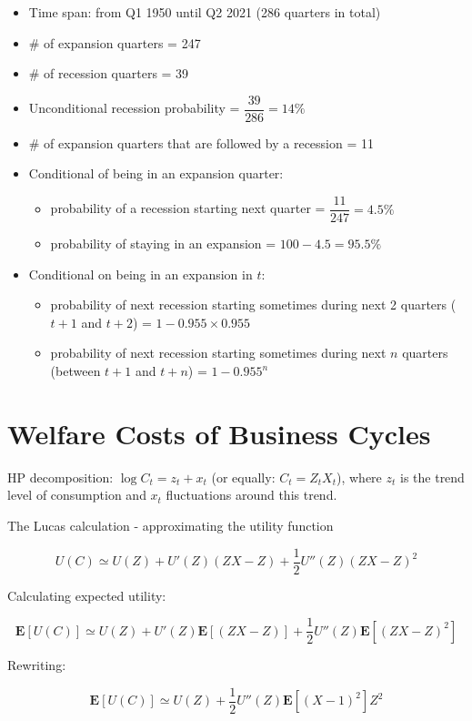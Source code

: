 \documentclass{article}
\begin{document}
\begin{itemize}
    \item Time span: from Q1 1950 until Q2 2021 (286 quarters in total)
    \item \# of expansion quarters = 247
    \item \# of recession quarters = 39
    \item Unconditional recession probability = $\dfrac{39}{286}=14\%$
    \item \# of expansion quarters that are followed by a recession = 11
    \item Conditional of being in an expansion quarter:
    \begin{itemize}
        \item probability of a recession starting next quarter = $\dfrac{11}{247}=4.5\%$
        \item probability of staying in an expansion = $100-4.5=95.5\%$
    \end{itemize}
    \item Conditional on being in an expansion in $t$:
    \begin{itemize}
        \item probability of next recession starting sometimes during next 2 quarters ($t+1$ and $t+2$) = $1-0.955\times0.955$
        \item probability of next recession starting sometimes during next $n$ quarters (between $t+1$ and $t+n$) = $1-0.955^n$
    \end{itemize}
\end{itemize}

\section{Welfare Costs of Business Cycles}


HP decomposition: $\log C_t=z_t+x_t$ (or equally: $C_t=Z_tX_t$), where $z_t$ is the trend level of consumption and $x_t$ fluctuations around this trend.

The Lucas calculation - approximating the utility function

\[U(C)\simeq U(Z)+U'(Z)(ZX-Z)+\frac{1}{2}U''(Z)(ZX-Z)^2 \]

Calculating expected utility:

\[\mathbf{E}[U(C)]\simeq U(Z)+U'(Z)\mathbf{E}[(ZX-Z)]+\frac{1}{2}U''(Z)\mathbf{E}\left[(ZX-Z)^2 \right] \]

Rewriting:

\[\mathbf{E}[U(C)]\simeq U(Z)+\frac{1}{2}U''(Z)\mathbf{E}\left[(X-1)^2 \right]Z^2 \]
\end{document}
